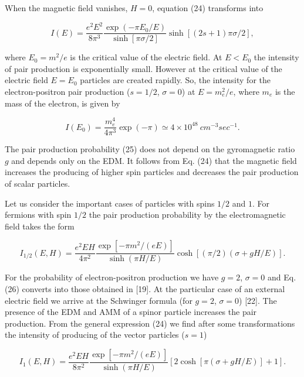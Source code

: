 \documentclass[a4paper,12pt]{article}
\begin{document}
When the magnetic field vanishes, $H=0$, equation (24) transforms into

\begin{equation}
I(E)=\frac{e^2 E^2}{8\pi ^3} \frac{\exp \left( -\pi E_0/E \right)} {\sinh
\left[\pi \sigma/2 \right] }\sinh \left[ (2s+1)\pi \sigma /2 \right],
\label{25}
\end{equation}

where $E_0=m^2 /e$ is the critical value of the electric field. At
$E<E_0$ the intensity of pair production is exponentially small.
However at the critical value of the electric field $E=E_0$
particles are created rapidly. So, the intensity for the
electron-positron pair production ($s=1/2$, $ \sigma =0$) at
$E=m_e^2 /e$, where $m_e$ is the mass of the electron, is given by

\[
I(E_0)=\frac{m_e^4}{4\pi^3}\exp(-\pi)\simeq4\times 10^{48}~cm^{-3}sec^{-1}.
\]

The pair production probability (25) does not depend on the gyromagnetic
ratio $g$ and depends only on the EDM. It follows from Eq. (24) that the
magnetic field increases the producing of higher spin particles and
decreases the pair production of scalar particles.

Let us consider the important cases of particles with spins $1/2$ and $1$.
For fermions with spin $1/2$ the pair production probability by the
electromagnetic field takes the form

\begin{equation}
I_{1/2}(E,H)=\frac{e^2EH}{4\pi ^2}\frac{\exp \left[ -\pi
m^2/(eE)\right] }{ \sinh \left( \pi H/E\right) }\cosh \left[
\left( \pi /2\right) \left( \sigma +gH/E\right) \right].
\label{26}
\end{equation}

For the probability of electron-positron production we have $g=2$,
$\sigma=0$ and Eq. (26) converts into those obtained in [19]. At
the particular case of an external electric field we arrive at the
Schwinger formula (for $g=2$, $ \sigma=0$) [22]. The presence of
the EDM and AMM of a spinor particle increases the pair
production. From the general expression (24) we find after some
transformations the intensity of producing of the vector particles
($s=1$)

\begin{equation}
I_{1}(E,H)=\frac{e^2EH}{8\pi ^2}\frac{\exp \left[ -\pi
m^2/(eE)\right] }{ \sinh \left( \pi H/E\right) }\left[2\cosh
\left[ \pi \left( \sigma +gH/E\right)\right]+1\right].  \label{27}
\end{equation}
\end{document}
